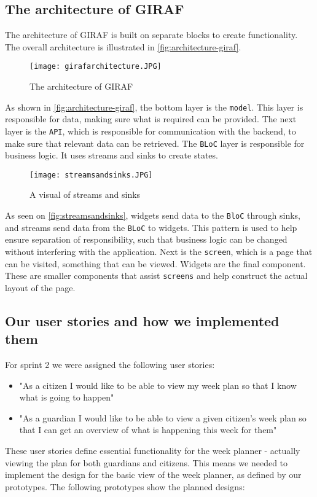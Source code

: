 \subsection{The architecture of GIRAF}
The architecture of GIRAF is built on separate blocks to create functionality. 
The overall architecture is illustrated in \autoref{fig:architecture-giraf}.
\begin{figure}[h]
  \centering
  \texttt{[image: girafarchitecture.JPG]}
  \caption{The architecture of GIRAF}
  \label{fig:architecture-giraf}
\end{figure}
As shown in \autoref{fig:architecture-giraf}, the bottom layer is the \texttt{model}.
This layer is responsible for data, making sure what is required can be provided.
The next layer is the \texttt{API}, which is responsible for communication with the backend, to make sure that relevant data can be retrieved.
The \texttt{BLoC} layer is responsible for business logic. 
It uses streams and sinks to create states.
\begin{figure}[h]
  \centering
  \texttt{[image: streamsandsinks.JPG]}
  \caption{A visual of streams and sinks}
  \label{fig:streamsandsinks}
\end{figure}
\noindent
As seen on \autoref{fig:streamsandsinks}, widgets send data to the \texttt{BloC} through sinks, and streams send data from the \texttt{BLoC} to widgets.
This pattern is used to help ensure separation of responsibility, such that business logic can be changed without interfering with the application.  
Next is the \texttt{screen}, which is a page that can be visited, something that can be viewed.
Widgets are the final component.
These are smaller components that assist \texttt{screens} and help construct the actual layout of the page. 

\subsection{Our user stories and how we implemented them}
For sprint 2 we were assigned the following user stories:

\begin{itemize}
    \item "As a citizen I would like to be able to view my week plan so that I know what is going to happen"
    \item "As a guardian I would like to be able to view a given citizen's week plan so that I can get an overview of what is happening this week for them"
\end{itemize}
These user stories define essential functionality for the week planner - actually viewing the plan for both guardians and citizens.
This means we needed to implement the design for the basic view of the week planner, as defined by our prototypes.
The following prototypes show the planned designs:


